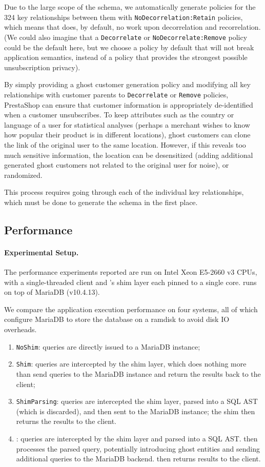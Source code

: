 Due to the large scope of the schema, we automatically generate policies for the 324 key relationships between them 
with \texttt{NoDecorrelation:Retain} policies, which means that \sys{} does, by default, no work upon
decorrelation and recorrelation. (We could also imagine that a \texttt{Decorrelate} or
\texttt{NoDecorrelate:Remove} policy could be
the default here, but we choose a policy by default that will not break application semantics,
instead of a policy that provides the strongest possible unsubscription privacy).

By simply providing a ghost customer generation policy and modifying all key relationships with
customer parents to \texttt{Decorrelate} or \texttt{Remove} policies, PrestaShop can ensure that
customer information is appropriately de-identified when a customer unsubscribes. To keep attributes
such as the country or language of a user for statistical analyses (perhaps a merchant wishes to
know how popular their product is in different locations), ghost customers can clone the link of the
original user to the same location.  However, if this reveals too much sensitive information, the
location can be desensitized (adding additional generated ghost customers not related to the
original user for noise), or randomized.

This process requires going through each of the individual key relationships, which must be done to
generate the schema in the first place.

\subsection{Performance}
\paragraph{Experimental Setup.}
The performance experiments reported are run on Intel Xeon E5-2660 v3 CPUs, with a
single-threaded client and \sys{}'s shim layer each pinned to a single core. \sys{} runs on top of 
MariaDB (v10.4.13). 

We compare the application execution performance on four systems, all of which configure MariaDB to
store the database on a ramdisk to avoid disk IO overheads.
\begin{enumerate}
    \item \texttt{NoShim}: queries are directly issued to a MariaDB instance;
    \item \texttt{Shim}: queries are intercepted by the shim layer,
        which does nothing more than send queries to the MariaDB instance and
        return the results back to the client;
    \item \texttt{ShimParsing}: queries are intercepted the shim layer, parsed into a
        SQL AST (which is discarded), and then sent to the MariaDB instance; the shim then returns the results to the
        client. 
    \item \texttt{\sys{}}: queries are intercepted by the shim layer and parsed into a SQL AST. \sys{}
        then processes the parsed query, potentially introducing ghost entities and sending additional queries to the MariaDB backend.
        \sys{} then returns results to the client.
\end{enumerate}

